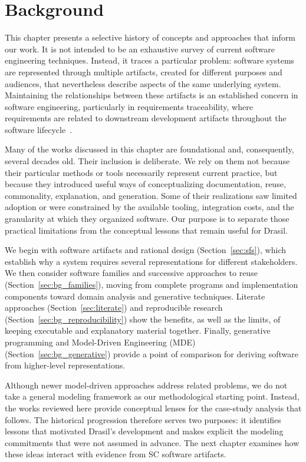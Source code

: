 \chapter{Background}
\label{c:background}

This chapter presents a selective history of concepts and approaches that
inform our work. It is not intended to be an exhaustive survey of current
software engineering techniques. Instead, it traces a particular problem:
software systems are represented through multiple artifacts, created for
different purposes and audiences, that nevertheless describe aspects of the
same underlying system. Maintaining the relationships between these artifacts
is an established concern in software engineering, particularly in
requirements traceability, where requirements are related to downstream
development artifacts throughout the software
lifecycle~\citep{GotelAndFinkelstein1994,WinklerAndPilgrim2010}.

Many of the works discussed in this chapter are foundational and, consequently,
several decades old. Their inclusion is deliberate. We rely on them not because
their particular methods or tools necessarily represent current practice, but
because they introduced useful ways of conceptualizing documentation, reuse,
commonality, explanation, and generation. Some of their realizations saw
limited adoption or were constrained by the available tooling, integration
costs, and the granularity at which they organized software. Our purpose is to
separate those practical limitations from the conceptual lessons that remain
useful for Drasil.

We begin with software artifacts and rational design (Section~\ref{sec:sfs}), 
which establish why a system requires several representations for different 
stakeholders. We then consider software families and successive
approaches to reuse (Section~\ref{sec:bg_families}), moving from complete 
programs and implementation components toward domain analysis and generative 
techniques. Literate approaches (Section~\ref{sec:literate}) and reproducible 
research (Section~\ref{sec:bg_reproducibility}) show the benefits, as well as 
the limits, of keeping executable and explanatory material together. Finally, 
generative programming and Model-Driven Engineering (MDE) 
(Section~\ref{sec:bg_generative}) provide a point of comparison for deriving 
software from higher-level representations.

Although newer model-driven approaches address related problems, we do not
take a general modeling framework as our methodological starting
point. Instead, the works reviewed here provide conceptual lenses for the
case-study analysis that follows. The historical progression therefore serves
two purposes: it identifies lessons that motivated Drasil's development and
makes explicit the modeling commitments that were not assumed in advance. The
next chapter examines how these ideas interact with evidence from SC software
artifacts.

